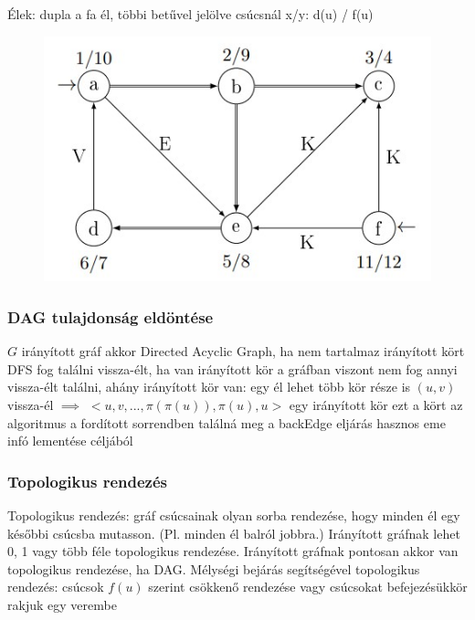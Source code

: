\documentclass[12pt,a4paper]{article}
\begin{document}
\begin{outline}
	\1 Élek: dupla a fa él, többi betűvel jelölve
	\1 csúcsnál x/y: d(u) / f(u)
\end{outline}

\begin{figure}[h!]
	\centering
	\includegraphics[width=0.5\linewidth]{dfs-példa}
\end{figure}

\pagebreak

\subsubsection{DAG tulajdonság eldöntése}

\begin{outline}
	\1 $G$ irányított gráf akkor Directed Acyclic Graph, ha nem tartalmaz irányított kört
	\1 DFS fog találni vissza-élt, ha van irányított kör a gráfban
		\2 viszont nem fog annyi vissza-élt találni, ahány irányított kör van:
		egy él lehet több kör része is
	\1 $(u,v)$ vissza-él $\implies$ $<u,v,...,\pi(\pi(u)),\pi(u),u>$ egy irányított kör
		\2 ezt a kört az algoritmus a fordított sorrendben találná meg
	\1 a backEdge eljárás hasznos eme infó lementése céljából
\end{outline}

\subsubsection{Topologikus rendezés}

\begin{outline}
	\1 Topologikus rendezés: gráf csúcsainak olyan sorba rendezése, hogy minden él egy későbbi csúcsba mutasson. (Pl. minden él balról jobbra.)
	\1 Irányított gráfnak lehet 0, 1 vagy több féle topologikus rendezése.
	\1 Irányított gráfnak pontosan akkor van topologikus rendezése, ha DAG.
	\1 Mélységi bejárás segítségével topologikus rendezés:
		\2 csúcsok $f(u)$ szerint csökkenő rendezése
		\2 vagy csúcsokat befejezésükkör rakjuk egy verembe
\end{outline}
\end{document}
